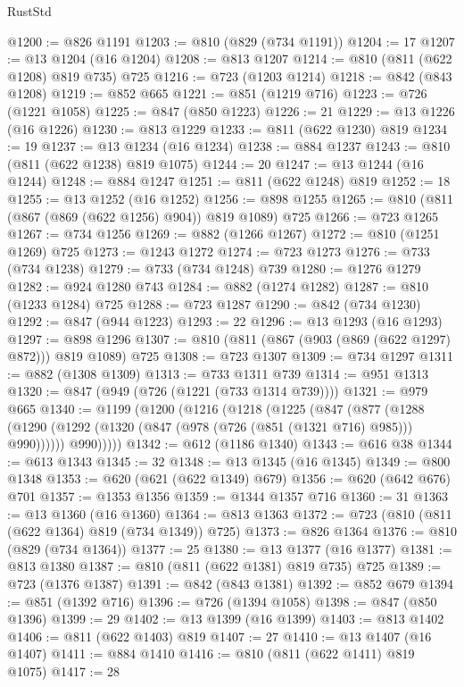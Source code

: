 \begin{lexlean}{RustStd}
\begin{coremodule}
@1200 := @826 @1191
@1203 := @810 (@829 (@734 @1191))
@1204 := 17
@1207 := @13 @1204 (@16 @1204)
@1208 := @813 @1207
@1214 := @810 (@811 (@622 @1208) @819 @735) @725
@1216 := @723 (@1203 @1214)
@1218 := @842 (@843 @1208)
@1219 := @852 @665
@1221 := @851 (@1219 @716)
@1223 := @726 (@1221 @1058)
@1225 := @847 (@850 @1223)
@1226 := 21
@1229 := @13 @1226 (@16 @1226)
@1230 := @813 @1229
@1233 := @811 (@622 @1230) @819
@1234 := 19
@1237 := @13 @1234 (@16 @1234)
@1238 := @884 @1237
@1243 := @810 (@811 (@622 @1238) @819 @1075)
@1244 := 20
@1247 := @13 @1244 (@16 @1244)
@1248 := @884 @1247
@1251 := @811 (@622 @1248) @819
@1252 := 18
@1255 := @13 @1252 (@16 @1252)
@1256 := @898 @1255
@1265 := @810 (@811 (@867 (@869 (@622 @1256) @904)) @819 @1089) @725
@1266 := @723 @1265
@1267 := @734 @1256
@1269 := @882 (@1266 @1267)
@1272 := @810 (@1251 @1269) @725
@1273 := @1243 @1272
@1274 := @723 @1273
@1276 := @733 (@734 @1238)
@1279 := @733 (@734 @1248) @739
@1280 := @1276 @1279
@1282 := @924 @1280 @743
@1284 := @882 (@1274 @1282)
@1287 := @810 (@1233 @1284) @725
@1288 := @723 @1287
@1290 := @842 (@734 @1230)
@1292 := @847 (@944 @1223)
@1293 := 22
@1296 := @13 @1293 (@16 @1293)
@1297 := @898 @1296
@1307 := @810 (@811 (@867 (@903 (@869 (@622 @1297) @872))) @819 @1089) @725
@1308 := @723 @1307
@1309 := @734 @1297
@1311 := @882 (@1308 @1309)
@1313 := @733 @1311 @739
@1314 := @951 @1313
@1320 := @847 (@949 (@726 (@1221 (@733 @1314 @739))))
@1321 := @979 @665
@1340 := @1199
    (@1200
      (@1216
        (@1218
          (@1225
            (@847
              (@877
                (@1288 (@1290 (@1292 (@1320 (@847 (@978 (@726 (@851 (@1321 @716) @985))) @990))))))
              @990)))))
@1342 := @612 (@1186 @1340)
@1343 := @616 @38
@1344 := @613 @1343
@1345 := 32
@1348 := @13 @1345 (@16 @1345)
@1349 := @800 @1348
@1353 := @620 (@621 (@622 @1349) @679)
@1356 := @620 (@642 @676) @701
@1357 := @1353 @1356
@1359 := @1344 @1357 @716
@1360 := 31
@1363 := @13 @1360 (@16 @1360)
@1364 := @813 @1363
@1372 := @723 (@810 (@811 (@622 @1364) @819 (@734 @1349)) @725)
@1373 := @826 @1364
@1376 := @810 (@829 (@734 @1364))
@1377 := 25
@1380 := @13 @1377 (@16 @1377)
@1381 := @813 @1380
@1387 := @810 (@811 (@622 @1381) @819 @735) @725
@1389 := @723 (@1376 @1387)
@1391 := @842 (@843 @1381)
@1392 := @852 @679
@1394 := @851 (@1392 @716)
@1396 := @726 (@1394 @1058)
@1398 := @847 (@850 @1396)
@1399 := 29
@1402 := @13 @1399 (@16 @1399)
@1403 := @813 @1402
@1406 := @811 (@622 @1403) @819
@1407 := 27
@1410 := @13 @1407 (@16 @1407)
@1411 := @884 @1410
@1416 := @810 (@811 (@622 @1411) @819 @1075)
@1417 := 28

\end{coremodule}
\end{lexlean}
